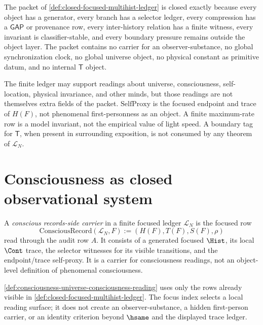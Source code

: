 \begin{principle}
\label{prin:consciousness-universe-closed-means-ledgered}
The packet of \autoref{def:closed-focused-multihist-ledger} is closed exactly because every object has a generator, every branch has a selector ledger, every compression has a $\mathsf{GAP}$ or provenance row, every inter-history relation has a finite witness, every invariant is classifier-stable, and every boundary pressure remains outside the object layer. The packet contains no carrier for an observer-substance, no global synchronization clock, no global universe object, no physical constant as primitive datum, and no internal $\mathsf{T}$ object.
\end{principle}

\begin{remark}
\label{rem:consciousness-universe-boundary-readings}
The finite ledger may support readings about universe, consciousness, self-location, physical invariance, and other minds, but those readings are not themselves extra fields of the packet. $\mathrm{SelfProxy}$ is the focused endpoint and trace of $H(F)$, not phenomenal first-personness as an object. A finite maximum-rate row is a model invariant, not the empirical value of light speed. A boundary tag for $\mathsf{T}$, when present in surrounding exposition, is not consumed by any theorem of $\mathcal{L}_N$.
\end{remark}

\section{Consciousness as closed observational system}
\label{sec:consciousness-universe-consciousness-as-closed}

\begin{definition}
\label{def:consciousness-universe-consciousness-reading}
A \emph{conscious records-side carrier} in a finite focused ledger $\mathcal{L}_N$ is the focused row
$$
\mathrm{ConsciousRecord}(\mathcal{L}_N,F)
  := (H(F),T(F),S(F),\rho)
$$
read through the audit row $A$. It consists of a generated focused $\Hist$, its local $\Cont$ trace, the selector witnesses for its visible transitions, and the endpoint/trace self-proxy. It is a carrier for consciousness readings, not an object-level definition of phenomenal consciousness.
\end{definition}

\begin{principle}
\label{prin:consciousness-universe-no-extra-content}
\autoref{def:consciousness-universe-consciousness-reading} uses only the rows already visible in \autoref{def:closed-focused-multihist-ledger}. The focus index selects a local reading surface; it does not create an observer-substance, a hidden first-person carrier, or an identity criterion beyond $\hsame$ and the displayed trace ledger.
\end{principle}

